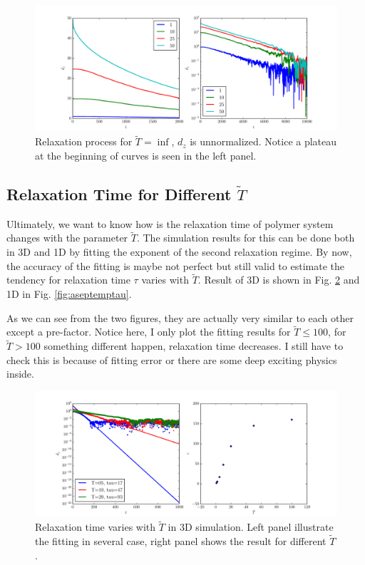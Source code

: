 \documentclass[12pt,a4paper]{article}
\begin{document}
\begin{figure}[htpb]
    \centering
    \includegraphics[width=1.0\linewidth]{fig4report/asep_N100_Tinf_un.pdf}
    \caption{Relaxation process for $\tilde{T}=\inf$, $d_z$ is unnormalized.
        Notice a plateau at the beginning of curves is seen in the left panel.} 
    \label{fig:aseptinfun}
\end{figure}

\subsection{Relaxation Time for Different $\tilde{T}$}
Ultimately, we want to know how is the relaxation time of polymer system changes
with the parameter $\tilde{T}$. The simulation results for this can be done both
in 3D and 1D by fitting the exponent of the second relaxation regime. By now,
the accuracy of the fitting is maybe not perfect but still valid to estimate the
tendency for relaxation time $\tau$ varies with $\tilde{T}$. Result of 3D is
shown in Fig. \ref{fig:bdtemptau} and 1D in Fig. \ref{fig:aseptemptau}.

As we can see from the two figures, they are actually very similar to each other
except a pre-factor. Notice here, I only plot the fitting results for $\tilde{T}
\leqslant 100$, for $\tilde{T} > 100$ something different happen, relaxation
time decreases. I still have to check this is because of fitting error or there
are some deep exciting physics inside.
\begin{figure}[htpb]
    \centering
    \includegraphics[width=1.0\linewidth]{fig4report/bdTempTau.pdf}
    \caption{Relaxation time varies with $\tilde{T}$ in 3D simulation. Left
        panel illustrate the fitting in several case, right panel shows the
        result for different $\tilde{T}$.} 
    \label{fig:bdtemptau}
\end{figure}
\end{document}
